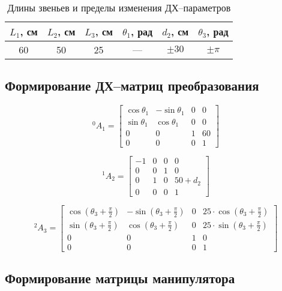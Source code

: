 \documentclass[oneside, final, 14pt]{extarticle}
\begin{document}
\begin{table}[h]
\centering
\begin{tabular}{|c|c|c|c|c|c|}
  \hline  \(L_1\), см & \(L_2\), см & \(L_3\), см & \(\theta_1\), рад & \(d_2\), см & \(\theta_3\), рад \\ \hline
  60 & 50 & 25 & --- & \(\pm 30\) & \(\pm \pi\) \\ \hline
\end{tabular}
\caption{Длины звеньев и пределы изменения ДХ--параметров}
\label{t:var-param}
\end{table}

\subsection{Формирование ДХ--матриц преобразования}

\begin{displaymath}
  {}^0A_1 = 
  \begin{bmatrix}
    \cos{\theta_1} & -\sin{\theta_1} & 0 & 0 \\
	\sin{\theta_1} & \cos{\theta_1} & 0 & 0 \\
	0 & 0 & 1 & 60 \\
	0 & 0 & 0 & 1
  \end{bmatrix}
\end{displaymath}

\begin{displaymath}
  {}^1A_2 = 
  \begin{bmatrix}
    -1 & 0 & 0 & 0 \\
	0 & 0 & 1 & 0 \\
	0 & 1 & 0 & 50+d_2 \\
	0 & 0 & 0 & 1
  \end{bmatrix}
\end{displaymath}

\begin{displaymath}
  {}^2A_3 = 
  \begin{bmatrix}
    \cos{(\theta_3+\frac{\pi}{2})} & -\sin{(\theta_3+\frac{\pi}{2})} & 0 & 25 \cdot \cos{(\theta_3+\frac{\pi}{2})} \\
	\sin{(\theta_3+\frac{\pi}{2})} & \cos{(\theta_3+\frac{\pi}{2})} & 0 & 25 \cdot \sin{(\theta_3+\frac{\pi}{2})} \\
	0 & 0 & 1 & 0 \\
	0 & 0 & 0 & 1
  \end{bmatrix}
\end{displaymath}

\subsection{Формирование матрицы манипулятора}
\end{document}
